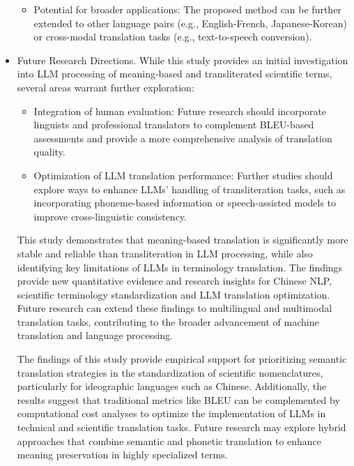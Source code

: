 \documentclass[conference]{IEEEtran}
\begin{document}
\begin{CJK*}{UTF8}{gbsn}
\begin{itemize}
\begin{itemize}
    \item Potential for broader applications: The proposed method can be further extended to other language pairs (e.g., English-French, Japanese-Korean) or cross-modal translation tasks (e.g., text-to-speech conversion).
\end{itemize}
\item Future Research Directions. While this study provides an initial investigation into LLM processing of meaning-based and transliterated scientific terms, several areas warrant further exploration:
\begin{itemize}
\item  Integration of human evaluation: Future research should incorporate linguists and professional translators to complement BLEU-based assessments and provide a more comprehensive analysis of translation quality.
\item  Optimization of LLM translation performance: Further studies should explore ways to enhance LLMs’ handling of transliteration tasks, such as incorporating phoneme-based information or speech-assisted models to improve cross-linguistic consistency.
\end{itemize}

This study demonstrates that meaning-based translation is significantly more stable and reliable than transliteration in LLM processing, while also identifying key limitations of LLMs in terminology translation. The findings provide new quantitative evidence and research insights for Chinese NLP, scientific terminology standardization and LLM translation optimization. Future research can extend these findings to multilingual and multimodal translation tasks, contributing to the broader advancement of machine translation and language processing.

\color{blue}
The findings of this study provide empirical support for prioritizing semantic translation strategies in the standardization of scientific nomenclatures, particularly for ideographic languages such as Chinese. Additionally, the results suggest that traditional metrics like BLEU can be complemented by computational cost analyses to optimize the implementation of LLMs in technical and scientific translation tasks. Future research may explore hybrid approaches that combine semantic and phonetic translation to enhance meaning preservation in highly specialized terms.
\color{black}

\end{itemize}



\end{CJK*}
\end{document}
